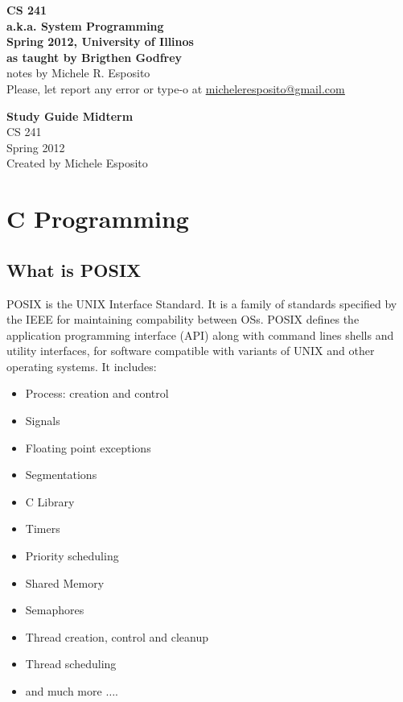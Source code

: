 \documentclass[a4paper]{article}
\begin{document}
\begin{center}
{\bf{\huge CS 241 }}\\
{\bf{\huge a.k.a. System Programming}}\\
\vspace{ 5 cm }
{\bf{\large Spring 2012, University of Illinos}}\\
{\bf{\large as taught by Brigthen Godfrey}}\\
\vspace{ 1 cm }                         
{\large notes by Michele R. Esposito}\\
\vspace{ 5cm }
Please, let report any error or type-o at \underline{\href{mailto:micheleresposito@gmail.com}{ micheleresposito@gmail.com }}

\end{center}

\newpage
\tableofcontents
\newpage
\begin{center}
{\bf{\huge Study Guide Midterm }}\\
CS 241 \\
Spring 2012 \\
Created by Michele Esposito\\
\end{center}

\section{C Programming} %
\label{sec:C Programming}
\subsection{What is POSIX} %
\label{sub:What is POSIX}
POSIX is the UNIX Interface Standard. It is a family of standards specified by the IEEE for maintaining compability between
OSs. POSIX defines the application programming interface (API) along with command lines shells and utility interfaces, for software
compatible with variants of UNIX and other operating systems. It includes:
\begin{itemize}
  \item Process: creation and control
  \item Signals
  \item Floating point exceptions
  \item Segmentations
  \item C Library
  \item Timers
  \item Priority scheduling
  \item Shared Memory
  \item Semaphores
  \item Thread creation, control and cleanup
  \item Thread scheduling
  \item and much more $\dots$.
\end{itemize}
\end{document}
